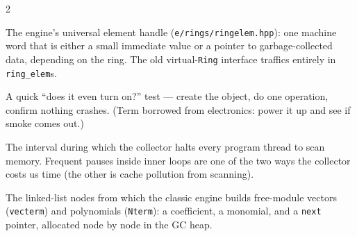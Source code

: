 \documentclass[11pt,oneside]{report}
\newcommand{\code}[1]{\textcolor{m2code}{\texttt{#1}}}
\newcommand{\file}[1]{\textcolor{m2file}{\texttt{#1}}}
\begin{document}
\begin{multicols}{2}
\begin{description}[style=nextline,itemsep=3pt]
\item[ring\_elem] The engine's universal element handle
(\file{e/rings/ringelem.hpp}): one machine word that is either a small
immediate value or a pointer to garbage-collected data, depending on the ring.
The old virtual-\code{Ring} interface traffics entirely in \code{ring\_elem}s.

\item[Smoke test] A quick ``does it even turn on?'' test --- create the object,
do one operation, confirm nothing crashes. (Term borrowed from electronics:
power it up and see if smoke comes out.)

\item[Stop-the-world pause] The interval during which the collector halts every
program thread to scan memory. Frequent pauses inside inner loops are one of
the two ways the collector costs us time (the other is cache pollution from
scanning).

\item[vecterm / Nterm] The linked-list nodes from which the classic engine
builds free-module vectors (\code{vecterm}) and polynomials (\code{Nterm}): a
coefficient, a monomial, and a \code{next} pointer, allocated node by node in
the GC heap.

\end{description}
\end{multicols}
\end{document}
